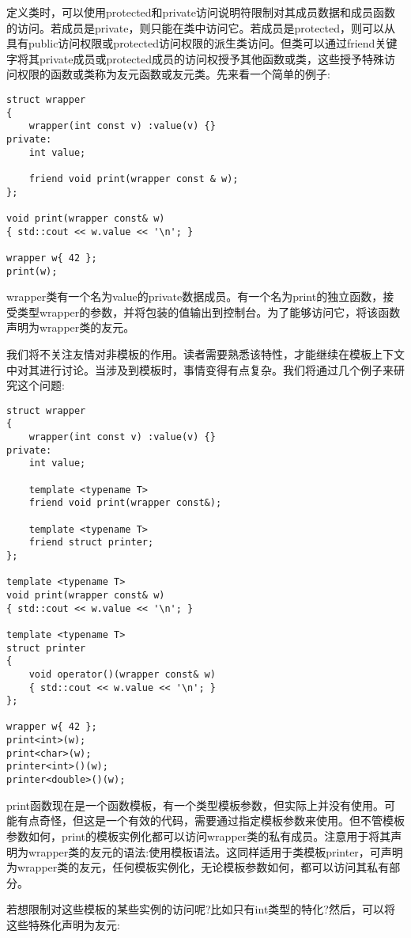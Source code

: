 定义类时，可以使用protected和private访问说明符限制对其成员数据和成员函数的访问。若成员是private，则只能在类中访问它。若成员是protected，则可以从具有public访问权限或protected访问权限的派生类访问。但类可以通过friend关键字将其private成员或protected成员的访问权授予其他函数或类，这些授予特殊访问权限的函数或类称为友元函数或友元类。先来看一个简单的例子:

\begin{lstlisting}[style=styleCXX]
struct wrapper
{
	wrapper(int const v) :value(v) {}
private:
	int value;
	
	friend void print(wrapper const & w);
};

void print(wrapper const& w)
{ std::cout << w.value << '\n'; }

wrapper w{ 42 };
print(w);
\end{lstlisting}

wrapper类有一个名为value的private数据成员。有一个名为print的独立函数，接受类型wrapper的参数，并将包装的值输出到控制台。为了能够访问它，将该函数声明为wrapper类的友元。

我们将不关注友情对非模板的作用。读者需要熟悉该特性，才能继续在模板上下文中对其进行讨论。当涉及到模板时，事情变得有点复杂。我们将通过几个例子来研究这个问题:

\begin{lstlisting}[style=styleCXX]
struct wrapper
{
	wrapper(int const v) :value(v) {}
private:
	int value;
	
	template <typename T>
	friend void print(wrapper const&);
	
	template <typename T>
	friend struct printer;
};

template <typename T>
void print(wrapper const& w)
{ std::cout << w.value << '\n'; }

template <typename T>
struct printer
{
	void operator()(wrapper const& w)
	{ std::cout << w.value << '\n'; }
};

wrapper w{ 42 };
print<int>(w);
print<char>(w);
printer<int>()(w);
printer<double>()(w);
\end{lstlisting}

print函数现在是一个函数模板，有一个类型模板参数，但实际上并没有使用。可能有点奇怪，但这是一个有效的代码，需要通过指定模板参数来使用。但不管模板参数如何，print的模板实例化都可以访问wrapper类的私有成员。注意用于将其声明为wrapper类的友元的语法:使用模板语法。这同样适用于类模板printer，可声明为wrapper类的友元，任何模板实例化，无论模板参数如何，都可以访问其私有部分。

若想限制对这些模板的某些实例的访问呢?比如只有int类型的特化?然后，可以将这些特殊化声明为友元:

